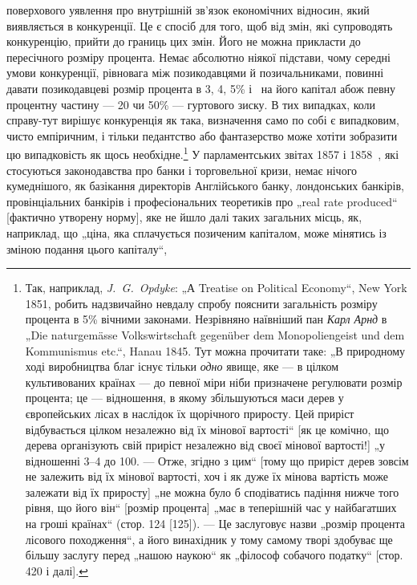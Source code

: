 \parcont{}  %
поверхового уявлення про внутрішній зв’язок економічних відносин,
який виявляється в конкуренції. Це є спосіб для того, щоб від
змін, які супроводять конкуренцію, прийти до границь цих змін.
Його не можна прикласти до пересічного розміру процента.
Немає абсолютно ніякої підстави, чому середні умови конкуренції,
рівновага між позикодавцями й позичальниками, повинні давати
позикодавцеві розмір процента в 3, 4, 5\% і~ на його капітал
абож певну процентну частину — 20 чи 50\% — гуртового
зиску. В тих випадках, коли справу-тут вирішує конкуренція як
така, визначення само по собі є випадковим, чисто емпіричним,
і тільки педантство або фантазерство може хотіти зобразити
цю випадковість як щось необхідне.\footnote{
Так, наприклад, \emph{J.~G.~Opdyke}: „А Treatise on Political Economy“, New
York 1851, робить надзвичайно невдалу спробу пояснити загальність розміру
процента в 5\% вічними законами. Незрівняно наївніший пан \emph{Карл Арнд} в „Die
naturgemässe Volkswirtschaft gegenüber dem Monopoliengeist und dem Kommunismus
etc.“, Hanau 1845. Тут можна прочитати таке: „В природному ході виробництва
благ існує тільки \emph{одно} явище, яке — в цілком культивованих країнах — до
певної міри ніби призначене регулювати розмір процента; це — відношення,
в якому збільшуються маси дерев у європейських лісах в наслідок їх щорічного
приросту. Цей приріст відбувається цілком незалежно від їх мінової вартості“
[як це комічно, що дерева організують свій приріст незалежно від своєї мінової
вартості!] „у відношенні 3--4 до 100. — Отже, згідно з цим“ [тому що приріст
дерев зовсім не залежить від їх мінової вартості, хоч і як дуже їх мінова вартість
може залежати від їх приросту] „не можна було б сподіватись падіння
нижче того рівня, що його він“ [розмір процента] „має в теперішній час у
найбагатших на гроші країнах“ (стор. 124 [125]). — Це заслуговує назви „розмір
процента лісового походження“, а його винахідник у тому самому творі здобуває
ще більшу заслугу перед „нашою наукою“ як „філософ собачого податку“
[стор. 420 і далі].
} У парламентських звітах
1857 і 1858~, які стосуються законодавства про банки і торговельної
кризи, немає нічого кумеднішого, як базікання директорів
Англійського банку, лондонських банкірів, провінціальних
банкірів і професіональних теоретиків про „real rate produced“
[фактично утворену норму], яке не йшло далі таких загальних
місць, як, наприклад, що „ціна, яка сплачується позиченим
капіталом, може мінятись із зміною подання цього капіталу“,
